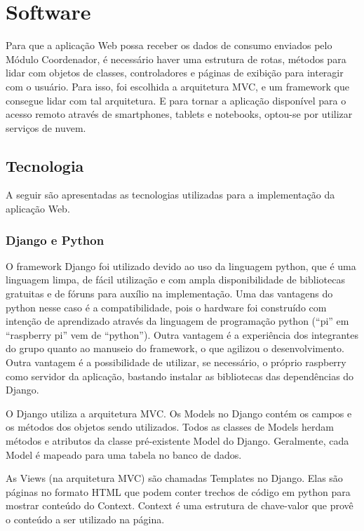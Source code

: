 \section{Software}
\label{Sec:software}
Para que a aplicação Web possa receber os dados de consumo enviados pelo Módulo Coordenador, é necessário haver uma estrutura de rotas, métodos para lidar com objetos de classes, controladores e páginas de exibição para interagir com o usuário. Para isso, foi escolhida a arquitetura MVC, e um framework que consegue lidar com tal arquitetura. E para tornar a aplicação disponível para o acesso remoto através de smartphones, tablets e notebooks, optou-se por utilizar serviços de nuvem. 

\subsection{Tecnologia}

A seguir são apresentadas as tecnologias utilizadas para a implementação da aplicação Web.

\subsubsection{Django e Python}

O framework Django \cite{django_framework_site} foi utilizado devido ao uso da linguagem python, que é uma linguagem limpa, de fácil utilização e com ampla disponibilidade de bibliotecas gratuitas e de fóruns para auxílio na implementação. Uma das vantagens do python nesse caso é a compatibilidade, pois o hardware foi construído com intenção de aprendizado através da linguagem de programação python \cite{raspberry_pi_site}(``pi'' em ``raspberry pi'' vem de ``python''). Outra vantagem é a experiência dos integrantes do grupo quanto ao manuseio do framework, o que agilizou o desenvolvimento. Outra vantagem é a possibilidade de utilizar, se necessário, o próprio raspberry como servidor da aplicação, bastando instalar as bibliotecas das dependências do Django.

O Django utiliza a arquitetura MVC. Os Models no Django contém os campos e os métodos dos objetos sendo utilizados. Todos as classes de Models herdam métodos e atributos da classe pré-existente Model do Django. Geralmente, cada Model é mapeado para uma tabela no banco de dados.

As Views (na arquitetura MVC) são chamadas Templates no Django. Elas são páginas no formato HTML que podem conter trechos de código em python para mostrar conteúdo do Context. Context é uma estrutura de chave-valor que provê o conteúdo a ser utilizado na página.

